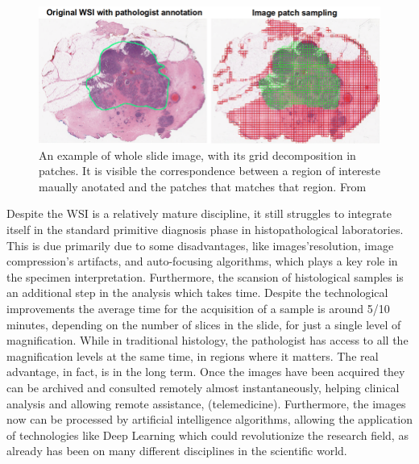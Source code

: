 \begin{figure}
    \centering
    \includegraphics[width = \textwidth]{images/patches_grid}
    \caption{An example of whole slide image, with its grid decomposition in patches. It is visible the correspondence between a region of intereste maually anotated and the patches that matches that region. From \cite{WSI_grid}}
    \label{fig:patches_grid}
\end{figure}

Despite the WSI is a relatively mature discipline, it still struggles to integrate itself in the standard primitive diagnosis phase in histopathological laboratories. This is due primarily due to some disadvantages, like images'resolution, image compression's artifacts, and auto-focusing algorithms, which plays a key role in the specimen interpretation. Furthermore, the scansion of histological samples is an additional step in the analysis which takes time. Despite the technological improvements the average time for the acquisition of a sample is around 5/10 minutes, depending on the number of slices in the slide, for just a single level of magnification. While in traditional histology, the pathologist has access to all the magnification levels at the same time, in regions where it matters. The real advantage, in fact, is in the long term. Once the images have been acquired they can be archived and consulted remotely almost instantaneously, helping clinical analysis and allowing remote assistance, (telemedicine). Furthermore, the images now can be processed by artificial intelligence algorithms, allowing the application of technologies like Deep Learning which could revolutionize the research field, as already has been on many different disciplines in the scientific world.

